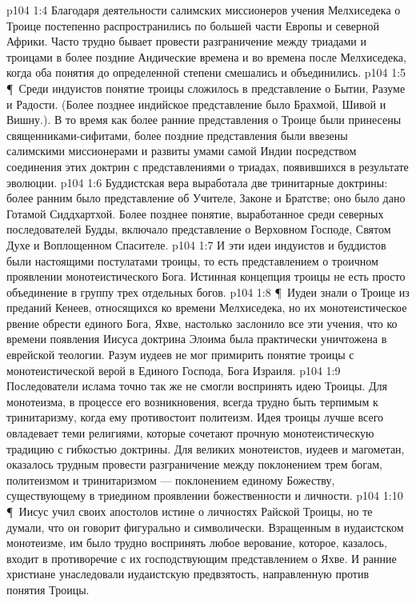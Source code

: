 \vs p104 1:4 Благодаря деятельности салимских миссионеров учения Мелхиседека о Троице постепенно распространились по большей части Европы и северной Африки. Часто трудно бывает провести разграничение между триадами и троицами в более поздние Андические времена и во времена после Мелхиседека, когда оба понятия до определенной степени смешались и объединились.
\vs p104 1:5 \P\ Среди индуистов понятие троицы сложилось в представление о Бытии, Разуме и Радости. (Более позднее индийское представление было Брахмой, Шивой и Вишну.). В то время как более ранние представления о Троице были принесены священниками\hyp{}сифитами, более поздние представления были ввезены салимскими миссионерами и развиты умами самой Индии посредством соединения этих доктрин с представлениями о триадах, появившихся в результате эволюции.
\vs p104 1:6 Буддистская вера выработала две тринитарные доктрины: более ранним было представление об Учителе, Законе и Братстве; оно было дано Готамой Сиддхартхой. Более позднее понятие, выработанное среди северных последователей Будды, включало представление о Верховном Господе, Святом Духе и Воплощенном Спасителе.
\vs p104 1:7 И эти идеи индуистов и буддистов были настоящими постулатами троицы, то есть представлением о троичном проявлении монотеистического Бога. Истинная концепция троицы не есть просто объединение в группу трех отдельных богов.
\vs p104 1:8 \P\ Иудеи знали о Троице из преданий Кенеев, относящихся ко времени Мелхиседека, но их монотеистическое рвение обрести единого Бога, Яхве, настолько заслонило все эти учения, что ко времени появления Иисуса доктрина Элоима была практически уничтожена в еврейской теологии. Разум иудеев не мог примирить понятие троицы с монотеистической верой в Единого Господа, Бога Израиля.
\vs p104 1:9 Последователи ислама точно так же не смогли воспринять идею Троицы. Для монотеизма, в процессе его возникновения, всегда трудно быть терпимым к тринитаризму, когда ему противостоит политеизм. Идея троицы лучше всего овладевает теми религиями, которые сочетают прочную монотеистическую традицию с гибкостью доктрины. Для великих монотеистов, иудеев и магометан, оказалось трудным провести разграничение между поклонением трем богам, политеизмом и тринитаризмом --- поклонением единому Божеству, существующему в триедином проявлении божественности и личности.
\vs p104 1:10 \P\ Иисус учил своих апостолов истине о личностях Райской Троицы, но те думали, что он говорит фигурально и символически. Взращенным в иудаистском монотеизме, им было трудно воспринять любое верование, которое, казалось, входит в противоречие с их господствующим представлением о Яхве. И ранние христиане унаследовали иудаистскую предвзятость, направленную против понятия Троицы.
